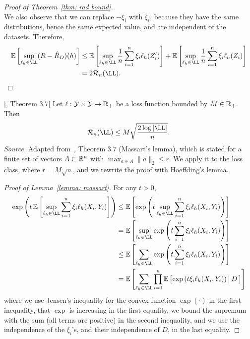 \documentclass[reqno]{amsart}
\begin{document}
\begin{theorem}
\begin{proof}[Proof of Theorem~\ref{thm: rad bound}]
\[\]
We also observe that we can replace $-\xi_i$ with $\xi_i$, because they have the same distributions, hence the same expected value, and are independent of the datasets. Therefore,
\begin{align*}
\expv\left[\sup_{\ell_h\in\LL}(R-\hat R_D)(h)\right] &\le \expv\left[\sup_{\ell_h\in\LL}\frac1n\sum_{i=1}^n \xi_i\ell_h(Z_i')\right] + \expv\left[\sup_{\ell_h\in\LL}\frac1n\sum_{i=1}^n \xi_i\ell_h(Z_i)\right] \\
&= 2\mathcal R_n(\LL).
\end{align*}
\end{proof}
\end{theorem}

\begin{lemma}[Massart]\label{lemma: massart} [\cite{mohri2018foundations}, Theorem 3.7]
Let $\ell:\mathcal{Y}\times\mathcal{Y}\to\mathbb{R}_+$ be a loss function bounded by $M\in\mathbb{R}_+$. Then
\[
\mathcal R_n(\LL) \le M\sqrt{\frac{2\log \vert\LL\vert}{n}}.
\]
\textnormal{\emph{Source.} Adapted from~\cite{mohri2018foundations}, Theorem 3.7 (Massart's lemma), which is stated for a finite set of vectors $A\subset\mathbb{R}^n$ with $\max_{a\in A}\|a\|_2\le r$. We apply it to the loss class, where $r = M\sqrt n$, and we rewrite the proof with Hoeffding's lemma.}

\begin{proof}[Proof of Lemma~\ref{lemma: massart}]
For any $t>0$,
\begin{align}
\exp\left(t\,\expv\left[\sup_{\ell_h\in\LL}\sum_{i=1}^n \xi_i\ell_h(X_i,Y_i)\right]\right)
&\le \expv\left[\exp\left(t\sup_{\ell_h\in\LL}\sum_{i=1}^n \xi_i\ell_h(X_i,Y_i)\right)\right] \notag\\
&= \expv\left[\sup_{\ell_h\in\LL}\exp\left(t\sum_{i=1}^n \xi_i\ell_h(X_i,Y_i)\right)\right] \notag\\
&\le \expv\left[\sum_{\ell_h\in\LL}\exp\left(t\sum_{i=1}^n \xi_i\ell_h(X_i,Y_i)\right)\right] \notag\\
&= \expv\left[\sum_{\ell_h\in\LL}\prod_{i=1}^n \expv\left[\exp\left(t\xi_i\ell_h(X_i,Y_i)\right)\big\vert \,D\,\right]\right]
\label{app/eq: massart start}
\end{align}
where we use Jensen's inequality for the convex function $\exp(\cdot)$ in the first inequality, that $\exp$ is increasing in the first equality, we bound the supremum with the sum (all terms are positive) in the second inequality, and we use the independence of the $\xi_i$'s, and their independence of $D$, in the last equality.


\end{proof}
\end{lemma}
\end{document}
